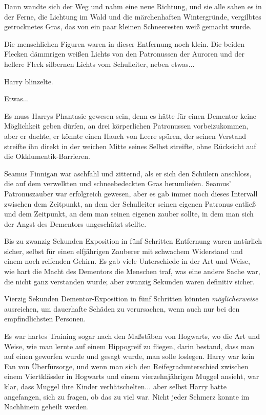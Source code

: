 {Dann wandte sich der Weg und nahm eine neue Richtung, und sie alle sahen es in der Ferne, die Lichtung im Wald und die märchenhaften Wintergründe, vergilbtes getrocknetes Gras, das von ein paar kleinen Schneeresten weiß gemacht wurde.

Die menschlichen Figuren waren in dieser Entfernung noch klein. Die beiden Flecken dämmrigen weißen Lichts von den Patronussen der Auroren und der hellere Fleck silbernen Lichts vom Schulleiter, neben etwas...

Harry blinzelte.

Etwas...

Es muss Harrys Phantasie gewesen sein, denn es hätte für einen Dementor keine Möglichkeit geben dürfen, an drei körperlichen Patronussen vorbeizukommen, aber er dachte, er könnte einen Hauch von Leere spüren, der seinen Verstand streifte ihn direkt in der weichen Mitte seines Selbst streifte, ohne Rücksicht auf die Okklumentik-Barrieren.

\hfill\break Seamus Finnigan war aschfahl und zitternd, als er sich den Schülern anschloss, die auf dem verwelkten und schneebedeckten Gras herumliefen. Seamus' Patronuszauber war erfolgreich gewesen, aber es gab immer noch dieses Intervall zwischen dem Zeitpunkt, an dem der Schulleiter seinen eigenen Patronus entließ und dem Zeitpunkt, an dem man seinen eigenen zauber sollte, in dem man sich der Angst des Dementors ungeschützt stellte.

Bis zu zwanzig Sekunden Exposition in fünf Schritten Entfernung waren natürlich sicher, selbst für einen elfjährigen Zauberer mit schwachem Widerstand und einem noch reifenden Gehirn. Es gab viele Unterschiede in der Art und Weise, wie hart die Macht des Dementors die Menschen traf, was eine andere Sache war, die nicht ganz verstanden wurde; aber zwanzig Sekunden waren definitiv sicher.

Vierzig Sekunden Dementor-Exposition in fünf Schritten könnten \emph{möglicherweise} ausreichen, um dauerhafte Schäden zu verursachen, wenn auch nur bei den empfindlichsten Personen.

Es war hartes Training sogar nach den Maßstäben von Hogwarts, wo die Art und Weise, wie man lernte auf einem Hippogreif zu fliegen, darin bestand, dass man auf einen geworfen wurde und gesagt wurde, man solle loslegen. Harry war kein Fan von Überfürsorge, und wenn man sich den Reifegradunterschied zwischen einem Viertklässler in Hogwarts und einem vierzehnjährigen Muggel ansieht, war klar, dass Muggel ihre Kinder verhätschelten... aber selbst Harry hatte angefangen, sich zu fragen, ob das zu viel war. Nicht jeder Schmerz konnte im Nachhinein geheilt werden.

}
